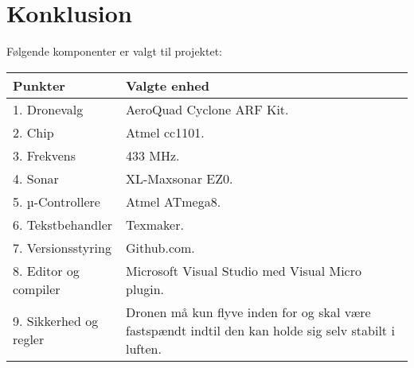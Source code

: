 \documentclass[Main]{subfiles}
\begin{document}
\chapter{Konklusion}
Følgende komponenter er valgt til projektet:\\

\begin{tabular}{p{} p{}}
\hline
Punkter & Valgte enhed \\ \hline
1. Dronevalg & AeroQuad Cyclone ARF Kit. \\
2. Chip & Atmel cc1101.\\
3. Frekvens & 433 MHz.\\
4. Sonar & XL-Maxsonar EZ0.\\
5. µ-Controllere & Atmel ATmega8.\\
6. Tekstbehandler & Texmaker.\\
7. Versionsstyring & Github.com.\\
8. Editor og compiler & Microsoft Visual Studio med Visual Micro plugin.\\
9. Sikkerhed og regler & Dronen må kun flyve inden for og skal være fastspændt indtil den kan holde sig selv stabilt i luften.\\ \hline
\end{tabular}
\end{document}

